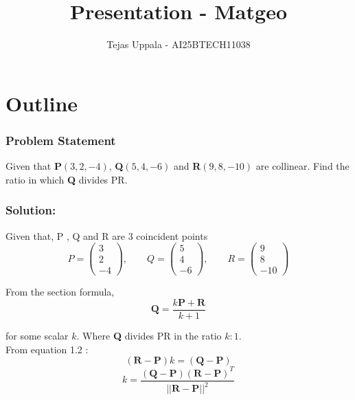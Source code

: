 \documentclass{beamer}
\title{Presentation - Matgeo}
\author{Tejas Uppala - AI25BTECH11038}
\providecommand{\brak}[1]{\ensuremath{\left(#1\right)}}
\theoremstyle{remark}
\newcommand{\myvec}[1]{\ensuremath{\begin{pmatrix}#1\end{pmatrix}}}
\numberwithin{equation}{section}
\begin{document}
\begin{frame}
\titlepage
\end{frame}

\section*{Outline}


\begin{frame}
\frametitle{Problem Statement}
Given that \textbf{P}$\brak{3, 2, {-4}}$, \textbf{Q}$\brak{5, 4, {-6}}$ and \textbf{R}$\brak{9,8,{-10}}$ are collinear. Find the ratio in which \textbf{Q} divides PR.
\end{frame}

\begin{frame}
\frametitle{Solution:}
Given that, P , Q and R are 3 coincident points 
\begin{equation}
P=\myvec{3\\2\\-4},\qquad
Q=\myvec{5\\4\\-6},\qquad
R=\myvec{9\\8\\-10}
\end{equation}

From the section formula,
\begin{equation}
\textbf{Q} = \frac{k\textbf{P} + \textbf{R}}{k + 1} 
\end{equation}

for some scalar $k$. Where \textbf{Q} divides PR in the ratio $k : 1$. \\
From equation 1.2 : 
\begin{equation}
 \brak{\textbf{R}-\textbf{P}}k=\brak{\textbf{Q}-\textbf{P}}  
\end{equation}
\begin{equation}
   k = \frac{\brak{\textbf{Q}-\textbf{P}}\brak{\textbf{R}-\textbf{P}}^T}{||\textbf{R}-\textbf{P}||^2}
\end{equation}
\end{frame}
\end{document}
